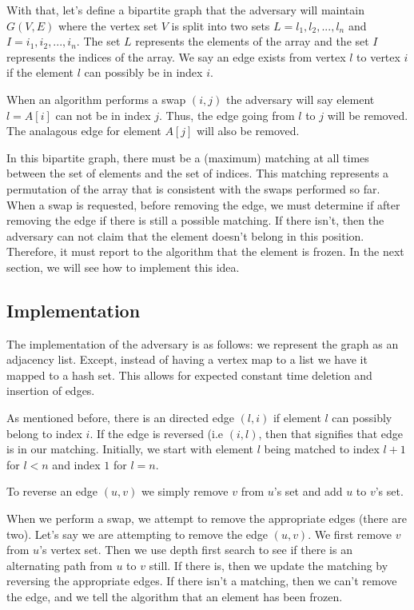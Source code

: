 \documentclass{article}
\begin{document}
With that, let's define a bipartite graph that
the adversary will maintain $G(V, E)$ where
the vertex set $V$ is split into two sets $L = {l_1, l_2, ..., l_n}$ and $I = {i_1, i_2, ..., i_n}$.
The set $L$ represents the elements of the array and the set $I$ represents the indices of the array.
We say an edge exists from vertex $l$ to vertex $i$ if the element $l$ can possibly be in index $i$.

When an algorithm performs a swap $(i, j)$ the adversary will say element $l = A[i]$ can not be in index $j$.
Thus, the edge going from $l$ to $j$ will be removed. The analagous edge for element $A[j]$ will also be removed.

In this bipartite graph, there must be a (maximum) matching at all times between the set of elements and the set
of indices. This matching represents a permutation of the array that is consistent with the swaps
performed so far. When a swap is requested, before removing the edge,
we must determine if after removing the edge if there is still a possible matching. If there isn't, then the adversary
can not claim that the element doesn't belong in this position. Therefore, it must report to the algorithm that
the element is frozen. In the next section, we will see how to implement this idea.

\subsection{Implementation}
The implementation of the adversary is as follows: we represent the graph as an adjacency list.
Except, instead of having a vertex map to a list we have it mapped to a hash set. This allows
for expected constant time deletion and insertion of edges.

As mentioned before, there is an directed edge $(l, i)$ if element $l$ can possibly belong to index $i$. 
If the edge is reversed (i.e $(i, l)$, then that signifies that edge is in our matching.
Initially, we start with element $l$ being matched to index $l+1$ for $l < n$ and index $1$ for $l = n$.

To reverse an edge $(u, v)$ we simply remove $v$ from $u$'s set and add $u$ to $v$'s set.

When we perform a swap, we attempt to remove the appropriate edges (there are two). Let's say
we are attempting to remove the edge $(u, v)$. We first remove $v$ from $u$'s vertex set. 
Then we use depth first search to see if there is an alternating path from $u$ to $v$ still.
If there is, then we update the matching by reversing the appropriate edges.
If there isn't a matching, then we can't remove the edge, and we tell the algorithm that
an element has been frozen.
\end{document}
